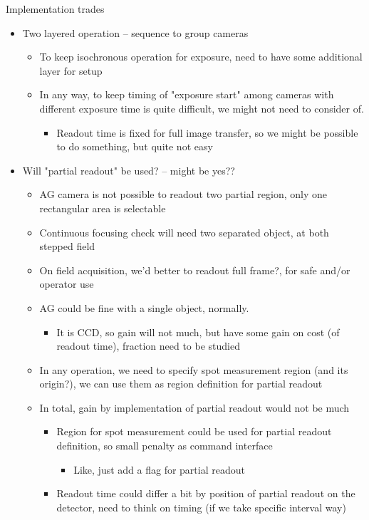 \documentclass[a4paper,notitlepage]{article}
\begin{document}
Implementation trades
\begin{itemize}
  \item Two layered operation -- sequence to group cameras
  \begin{itemize}
    \item To keep isochronous operation for exposure, need to have some additional layer for setup
    \item In any way, to keep timing of "exposure start" among cameras with different exposure time is quite difficult, we might not need to consider of.
    \begin{itemize}
      \item Readout time is fixed for full image transfer, so we might be possible to do something, but quite not easy
    \end{itemize}
  \end{itemize}
  \item Will "partial readout" be used? -- might be yes??
  \begin{itemize}
    \item AG camera is not possible to readout two partial region, only one rectangular area is selectable
    \item Continuous focusing check will need two separated object, at both stepped field
    \item On field acquisition, we’d better to readout full frame?, for safe and/or operator use
    \item AG could be fine with a single object, normally.
    \begin{itemize}
      \item It is CCD, so gain will not much, but have some gain on cost (of readout time), fraction need to be studied
    \end{itemize}
    \item In any operation, we need to specify spot measurement region (and its origin?), we can use them as region definition for partial readout
    \item In total, gain by implementation of partial readout would not be much
    \begin{itemize}
      \item Region for spot measurement could be used for partial readout definition, so small penalty as command interface
      \begin{itemize}
        \item Like, just add a flag for partial readout
      \end{itemize}
      \item Readout time could differ a bit by position of partial readout on the detector, need to think on timing (if we take specific interval way)

\end{itemize}
\end{itemize}
\end{itemize}
\end{document}
